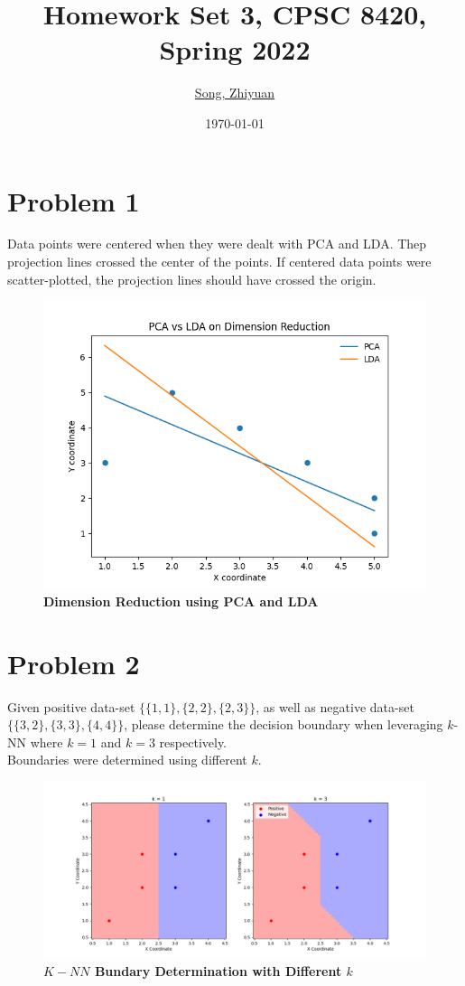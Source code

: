 \documentclass[11pt]{article}
\title{{\bf Homework Set 3, CPSC 8420, Spring 2022}} %
\author{\Large\underline{Song, Zhiyuan}}
\date{\today} %
\newcommand{\mfile}[1]  {{\small }} %
\begin{document}
\maketitle

\section*{Problem 1}
Data points were centered when they were dealt with PCA and LDA. Thep projection lines crossed the center of the points. If centered data points were scatter-plotted, the projection lines should have crossed the origin.
\begin{figure}
	\centering\includegraphics[width=.75\linewidth]{prob1.png}
	\caption{\textbf{Dimension Reduction using PCA and LDA} } %
	\label{fig:p1}
\end{figure}
\mfile{prob1.py}
\section*{Problem 2}
Given positive data-set $\{\{1,1\},\{2,2\},\{2,3\}\}$, as well as negative data-set $\{\{3,2\},\{3,3\},\{4,4\}\}$, please determine the decision boundary when leveraging $k$-NN where $k=1$ and $k=3$ respectively.\\
Boundaries were determined using different $k$.
\mfile{prob2.py}
\begin{figure}
	\centering\includegraphics[width=1\linewidth]{prob2.png}
	\caption{\textbf{$K-NN$ Bundary Determination with Different $k$} } %
	\label{fig:p2}
\end{figure}
\end{document}
